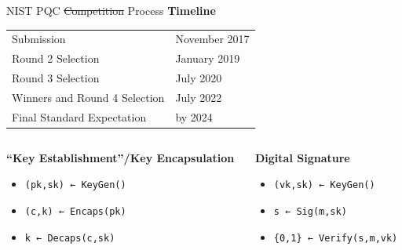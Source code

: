\documentclass[xcolor=table,10pt,aspectratio=169]{beamer}
\begin{document}
\begin{frame}[label={sec:org08351e5},fragile]{NIST PQC \sout{Competition} Process}
 \textbf{Timeline}

\begin{center}
\begin{tabular}{ll}
\toprule
Submission & November 2017\\[0pt]
Round 2 Selection & January 2019\\[0pt]
Round 3 Selection & July 2020\\[0pt]
Winners and Round 4 Selection & July 2022\\[0pt]
Final Standard Expectation & by 2024\\[0pt]
\bottomrule
\end{tabular}

\end{center}

\vspace{1em}

\begin{columns}[t]
\begin{column}{0.5\columnwidth}
\textbf{“Key Establishment”/Key Encapsulation}

\begin{itemize}
\item \texttt{(pk,sk) ← KeyGen()}
\item \texttt{(c,k) ← Encaps(pk)}
\item \texttt{k ← Decaps(c,sk)}
\end{itemize}
\end{column}

\begin{column}{0.5\columnwidth}
\textbf{Digital Signature}

\begin{itemize}
\item \texttt{(vk,sk)  ← KeyGen()}
\item \texttt{s  ← Sig(m,sk)}
\item \texttt{\{0,1\}  ← Verify(s,m,vk)}
\end{itemize}
\end{column}
\end{columns}
\end{frame}
\end{document}
